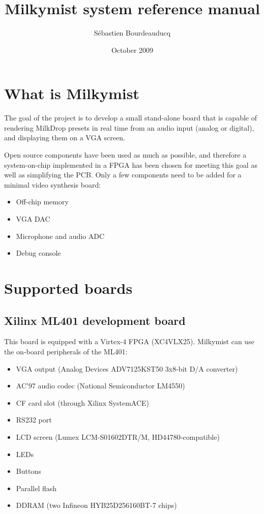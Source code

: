 \documentclass[a4paper,11pt]{article}
\title{Milkymist system reference manual}
\author{S\'ebastien Bourdeauducq}
\date{October 2009}
\begin{document}
\maketitle{}
\section{What is Milkymist}
The goal of the project is to develop a small stand-alone board that is capable of rendering MilkDrop presets in real time from an audio input (analog or digital), and displaying them on a VGA screen.

Open source components have been used as much as possible, and therefore a system-on-chip implemented in a FPGA has been chosen for meeting this goal as well as simplifying the PCB. Only a few components need to be added for a minimal video synthesis board:
\begin{itemize}
\item Off-chip memory
\item VGA DAC
\item Microphone and audio ADC
\item Debug console
\end{itemize}

\section{Supported boards}
\subsection{Xilinx ML401 development board}
This board is equipped with a Virtex-4 FPGA (XC4VLX25). Milkymist can use the on-board peripherals of the ML401:
\begin{itemize}
\item VGA output (Analog Devices ADV7125KST50 3x8-bit D/A converter)
\item AC'97 audio codec (National Semiconductor LM4550)
\item CF card slot (through Xilinx SystemACE)
\item RS232 port
\item LCD screen (Lumex LCM-S01602DTR/M, HD44780-compatible)
\item LEDs
\item Buttons
\item Parallel flash
\item DDRAM (two Infineon HYB25D256160BT-7 chips)
\end{itemize}
\end{document}
